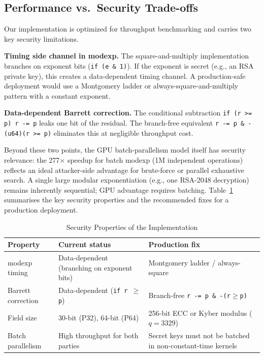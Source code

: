 \documentclass[conference]{IEEEtran}
\begin{document}
\subsection{Performance vs.\ Security Trade-offs}

Our implementation is optimized for throughput benchmarking and carries two
key security limitations.

\textbf{Timing side channel in modexp.}
The square-and-multiply implementation branches on exponent bits
(\texttt{if (e \& 1)}). If the exponent is secret (e.g., an RSA private key),
this creates a data-dependent timing channel. A production-safe deployment would
use a Montgomery ladder or always-square-and-multiply pattern with a constant
exponent.

\textbf{Data-dependent Barrett correction.}
The conditional subtraction \texttt{if (r >= p) r -= p} leaks one bit of the
residual. The branch-free equivalent
\texttt{r -= p \& -(u64)(r >= p)} eliminates this at negligible
throughput cost.

Beyond these two points, the GPU batch-parallelism model itself has
security relevance: the 277$\times$ speedup for batch modexp (1M independent
operations) reflects an ideal attacker-side advantage for brute-force or
parallel exhaustive search. A single large modular exponentiation (e.g., one
RSA-2048 decryption) remains inherently sequential; GPU advantage requires
batching. Table~\ref{tab:security} summarises the key security properties and
the recommended fixes for a production deployment.

\begin{table}[t]
\caption{Security Properties of the Implementation}
\label{tab:security}
\begin{center}
\begin{tabular}{|p{2.2cm}|p{2.0cm}|p{2.8cm}|}
\hline
\textbf{Property} & \textbf{Current status} & \textbf{Production fix} \\
\hline
modexp timing & Data-dependent (branching on exponent bits) & Montgomery ladder / always-square \\
\hline
Barrett correction & Data-dependent (\texttt{if r $\geq$ p}) & Branch-free \texttt{r -= p \& -(r$\geq$p)} \\
\hline
Field size & 30-bit (P32), 64-bit (P64) & 256-bit ECC or Kyber modulus ($q=3329$) \\
\hline
Batch parallelism & High throughput for both parties & Secret keys must not be batched in non-constant-time kernels \\
\hline
\end{tabular}
\end{center}
\end{table}
\end{document}
